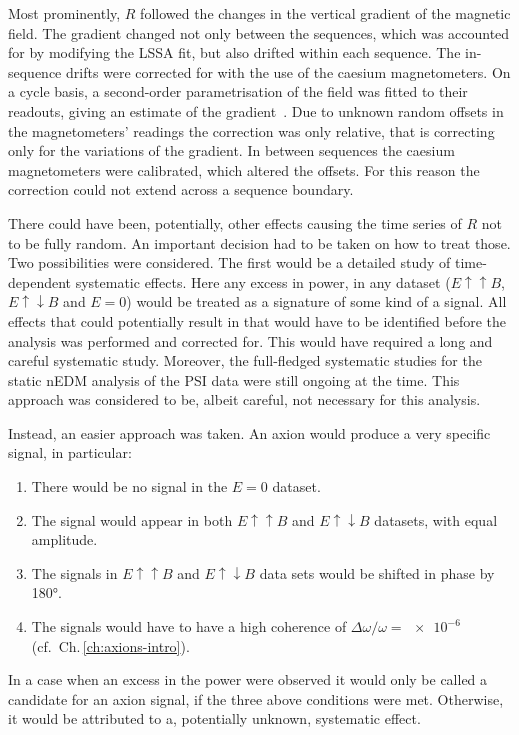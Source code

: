 Most prominently, $R$ followed the changes in the vertical gradient of the magnetic field. The gradient changed not only between the sequences, which was accounted for by modifying the LSSA fit, but also drifted within each sequence.
The in-sequence drifts were corrected for with the use of the caesium magnetometers. On a cycle basis, a second-order parametrisation of the field was fitted to their readouts, giving an estimate of the gradient~\cite{Afach2014magmoment,WurstenThesis}. Due to unknown random offsets in the magnetometers' readings the correction was only relative, that is correcting only for the variations of the gradient. In between sequences the caesium magnetometers were calibrated, which altered the offsets. For this reason the correction could not extend across a sequence boundary.

There could have been, potentially, other effects causing the time series of $R$ not to be fully random. An important decision had to be taken on how to treat those. Two possibilities were considered. The first would be a detailed study of time-dependent systematic effects.
Here any excess in power, in any dataset ($E \uparrow \uparrow B$, $E \uparrow \downarrow B$ and $E=0$) would be treated as a signature of some kind of a signal. All effects that could potentially result in that would have to be identified before the analysis was performed and corrected for. This would have required a long and careful systematic study. Moreover, the full-fledged systematic studies for the static nEDM analysis of the PSI data were still ongoing at the time. This approach was considered to be, albeit careful, not necessary for this analysis.

Instead, an easier approach was taken. An axion would produce a very specific signal, in particular:
\begin{enumerate}
  \item There would be no signal in the $E=0$ dataset.
  \item The signal would appear in both $E \uparrow \uparrow B$ and $E \uparrow \downarrow B$ datasets, with equal amplitude.
  \item The signals in $E \uparrow \uparrow B$ and $E \uparrow \downarrow B$ data sets would be shifted in phase by \ang{180}.
  \item The signals would have to have a high coherence of $\Delta \omega / \omega = \num{e-6}$ (cf.\ Ch.\,\ref{ch:axions-intro}).
\end{enumerate}
In a case when an excess in the power were observed it would only be called a candidate for an axion signal, if the three above conditions were met.
Otherwise, it would be attributed to a, potentially unknown, systematic effect.

